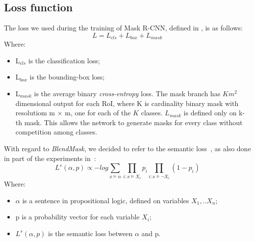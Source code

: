 \documentclass[10pt,twocolumn,letterpaper]{article}
\begin{document}
\subsection{Loss function}
The loss we used during the training of Mask R-CNN, defined in \cite{Authors1_maskrcnn}, is as follows:
\begin{equation}
L = L_{cls} + L_{box} + L_{mask} 
\label{loss_mask}
\end{equation}
Where:
\begin{itemize}
\item L$_{cls}$ is the classification loss;
\item L$_{box}$ is the bounding-box loss;
\item  L$_{mask}$ is the average binary \textit{cross-entropy} loss. The mask branch has $Km^2$ dimensional output for each RoI, where K is cardinality binary mask with resolutiom m $\times$ m, one for each of the $K$ classes. $L_{mask}$ is defined only on k-th mask. This allows the network to generate masks for every class without competition among classes.
\end{itemize}
\noindent
With regard to \textit{BlendMask}, we decided to refer to the semantic loss~\cite{Authors8_semanticloss}, as also done in part of the experiments in~\cite{Authors2_BlendMask}:
\begin{equation}
L^s(\alpha, p) \propto - log \sum_{x \models \alpha} \prod_{i:x \models X_i} p_i \prod_{i:x \models \neg X_i} (1-p_i)
\label{Loss_semantic}
\end{equation}
Where:
\begin{itemize}
\item $\alpha$ is a sentence in propositional logic, defined on variables $X_1,..X_n$;
\item p is a probability vector for each variable $X_i$;
\item $L^s(\alpha, p)$ is the semantic loss between $\alpha$ and p.
\end{itemize}
\end{document}
